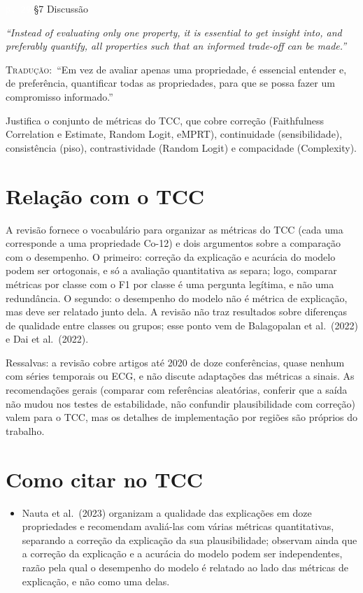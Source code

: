 \documentclass[11pt,a4paper]{article}
\newcommand{\pagechip}[1]{{\setlength{\fboxsep}{1.5pt}\colorbox{cAcc}{\textcolor{white}{\scriptsize\texttt{#1}}}}}
\newenvironment{origquote}{\par\itshape\small}{\par}
\newenvironment{tradquote}{\par\small\textsc{Tradução:}\ }{\par}
\newcommand{\explab}[1]{\par\smallskip{\small\color{cAcc}\textbf{\MakeUppercase{#1}}}\par}
\begin{document}
\begin{citacard}{\pagechip{p. 29} §7 Discussão}
\begin{origquote}“Instead of evaluating only one property, it is essential to get insight into, and preferably quantify, all properties such that an informed trade-off can be made.”\end{origquote}
\begin{tradquote}“Em vez de avaliar apenas uma propriedade, é essencial entender e, de preferência, quantificar todas as propriedades, para que se possa fazer um compromisso informado.”\end{tradquote}
\explab{Explicação}
Justifica o conjunto de métricas do TCC, que cobre correção (Faithfulness Correlation e Estimate, Random Logit, eMPRT), continuidade (sensibilidade), consistência (piso), contrastividade (Random Logit) e compacidade (Complexity).
\end{citacard}

\section{Relação com o TCC}
A revisão fornece o vocabulário para organizar as métricas do TCC (cada uma corresponde a uma propriedade Co-12) e dois argumentos sobre a comparação com o desempenho. O primeiro: correção da explicação e acurácia do modelo podem ser ortogonais, e só a avaliação quantitativa as separa; logo, comparar métricas por classe com o F1 por classe é uma pergunta legítima, e não uma redundância. O segundo: o desempenho do modelo não é métrica de explicação, mas deve ser relatado junto dela. A revisão não traz resultados sobre diferenças de qualidade entre classes ou grupos; esse ponto vem de Balagopalan et al.\ (2022) e Dai et al.\ (2022).

Ressalvas: a revisão cobre artigos até 2020 de doze conferências, quase nenhum com séries temporais ou ECG, e não discute adaptações das métricas a sinais. As recomendações gerais (comparar com referências aleatórias, conferir que a saída não mudou nos testes de estabilidade, não confundir plausibilidade com correção) valem para o TCC, mas os detalhes de implementação por regiões são próprios do trabalho.

\section{Como citar no TCC}
\begin{itemize}
  \item Nauta et al.\ (2023) organizam a qualidade das explicações em doze propriedades e recomendam avaliá-las com várias métricas quantitativas, separando a correção da explicação da sua plausibilidade; observam ainda que a correção da explicação e a acurácia do modelo podem ser independentes, razão pela qual o desempenho do modelo é relatado ao lado das métricas de explicação, e não como uma delas.
\end{itemize}
\end{document}
